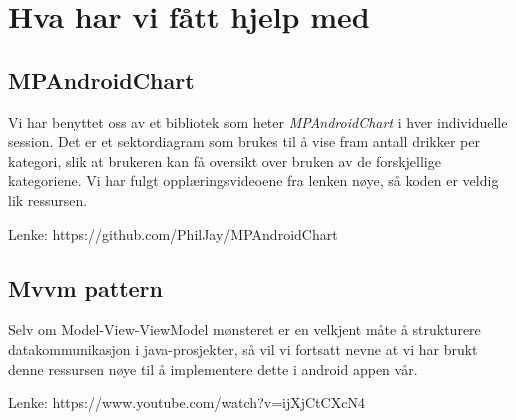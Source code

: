 \section{Hva har vi fått hjelp med}
\subsection{MPAndroidChart}
Vi har benyttet oss av et bibliotek som heter \textit{MPAndroidChart} i hver individuelle session. Det er et sektordiagram som brukes til å vise fram antall drikker per kategori, slik at brukeren kan få oversikt over bruken av de forskjellige kategoriene. Vi har fulgt opplæringsvideoene fra lenken nøye, så koden er veldig lik ressursen.

Lenke: https://github.com/PhilJay/MPAndroidChart

\subsection{Mvvm pattern}
Selv om Model-View-ViewModel mønsteret er en velkjent måte å strukturere datakommunikasjon i java-prosjekter, så vil vi fortsatt nevne at vi har brukt denne ressursen nøye til å implementere dette i android appen vår.

Lenke: https://www.youtube.com/watch?v=ijXjCtCXcN4
